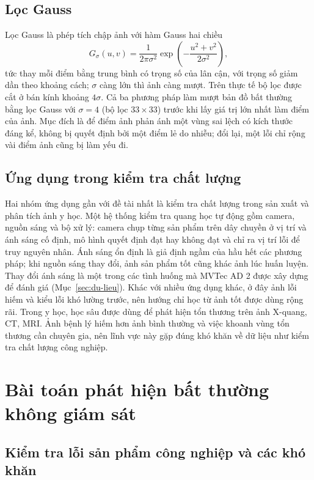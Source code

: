\subsection{Lọc Gauss}

Lọc Gauss là phép tích chập ảnh với hàm Gauss hai chiều
\begin{equation}
  G_\sigma(u, v) = \frac{1}{2\pi\sigma^2} \exp\!\left(-\frac{u^2+v^2}{2\sigma^2}\right),
  \label{eq:gauss}
\end{equation}
tức thay mỗi điểm bằng trung bình có trọng số của lân cận, với trọng số giảm dần theo khoảng cách; $\sigma$ càng lớn
thì ảnh càng mượt. Trên thực tế bộ lọc được cắt ở bán kính khoảng $4\sigma$. Cả ba phương pháp làm mượt bản đồ bất
thường bằng lọc Gauss với $\sigma = 4$ (bộ lọc $33\times33$) trước khi lấy giá trị lớn nhất làm điểm của ảnh. Mục đích
là để điểm ảnh phản ánh một vùng sai lệch có kích thước đáng kể, không bị quyết định bởi một điểm lẻ do nhiễu; đổi
lại, một lỗi chỉ rộng vài điểm ảnh cũng bị làm yếu đi.

\subsection{Ứng dụng trong kiểm tra chất lượng}

Hai nhóm ứng dụng gần với đề tài nhất là kiểm tra chất lượng trong sản xuất và phân tích ảnh y học. Một hệ thống kiểm
tra quang học tự động gồm camera, nguồn sáng và bộ xử lý: camera chụp từng sản phẩm trên dây chuyền ở vị trí và ánh
sáng cố định, mô hình quyết định đạt hay không đạt và chỉ ra vị trí lỗi để truy nguyên nhân. Ánh sáng ổn định là giả
định ngầm của hầu hết các phương pháp; khi nguồn sáng thay đổi, ảnh sản phẩm tốt cũng khác ảnh lúc huấn luyện. Thay đổi ánh sáng là một trong các tình huống mà
MVTec AD 2 được xây dựng để đánh giá (Mục~\ref{sec:du-lieu}). Khác với nhiều ứng dụng khác, ở đây ảnh
lỗi hiếm và kiểu lỗi khó lường trước, nên hướng chỉ học từ ảnh tốt được dùng rộng rãi. Trong y học, học sâu được dùng
để phát hiện tổn thương trên ảnh X-quang, CT, MRI. Ảnh bệnh lý hiếm hơn ảnh bình thường và việc khoanh vùng tổn thương
cần chuyên gia, nên lĩnh vực này gặp đúng khó khăn về dữ liệu như kiểm tra chất lượng công nghiệp.

\section{Bài toán phát hiện bất thường không giám sát}
\label{sec:anomaly}

\subsection{Kiểm tra lỗi sản phẩm công nghiệp và các khó khăn}

